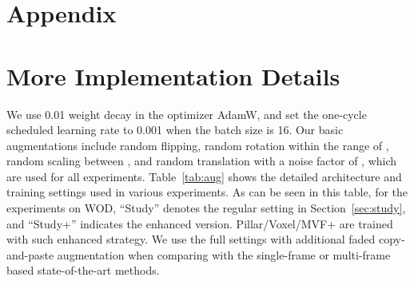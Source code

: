 \documentclass[10pt,twocolumn,letterpaper]{article}
\begin{document}
\newpage
{\small


}

\newpage
\appendix
\section*{Appendix} 

\section{More Implementation Details}\label{sec:training_recipes}
\label{recipe}

We use 0.01 weight decay in the optimizer AdamW, and set the one-cycle scheduled learning rate to 0.001 when the batch size is 16. Our basic augmentations include random flipping, random rotation within the range of , random scaling between , and random translation with a noise factor of , which are used for all experiments. Table~\ref{tab:aug} shows the detailed architecture and training settings used in various experiments. As can be seen in this table, for the experiments on WOD, ``Study'' denotes the regular setting in Section~\ref{sec:study}, and ``Study+'' indicates the enhanced version. Pillar/Voxel/MVF+ are trained with such enhanced strategy. We use the full settings with additional faded copy-and-paste augmentation when comparing with the single-frame or multi-frame based state-of-the-art methods.   
\end{document}
